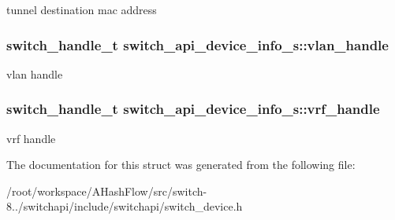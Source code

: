 tunnel destination mac address \hypertarget{structswitch__api__device__info__s_a195fea6eeb1f1ee9c0e0e2d22aaf979d}{
\subsubsection[{vlan\+\_\+handle}]{\setlength{\rightskip}{0pt plus 5cm}switch\+\_\+handle\+\_\+t switch\+\_\+api\+\_\+device\+\_\+info\+\_\+s\+::vlan\+\_\+handle}}\label{structswitch__api__device__info__s_a195fea6eeb1f1ee9c0e0e2d22aaf979d}
vlan handle \hypertarget{structswitch__api__device__info__s_abee10a0fa352b512256c72d305906a9f}{
\subsubsection[{vrf\+\_\+handle}]{\setlength{\rightskip}{0pt plus 5cm}switch\+\_\+handle\+\_\+t switch\+\_\+api\+\_\+device\+\_\+info\+\_\+s\+::vrf\+\_\+handle}}\label{structswitch__api__device__info__s_abee10a0fa352b512256c72d305906a9f}
vrf handle 

The documentation for this struct was generated from the following file\+:\begin{DoxyCompactItemize}
\item 
/root/workspace/\+A\+Hash\+Flow/src/switch-\/8../switchapi/include/switchapi/switch\+\_\+device.\+h\end{DoxyCompactItemize}
